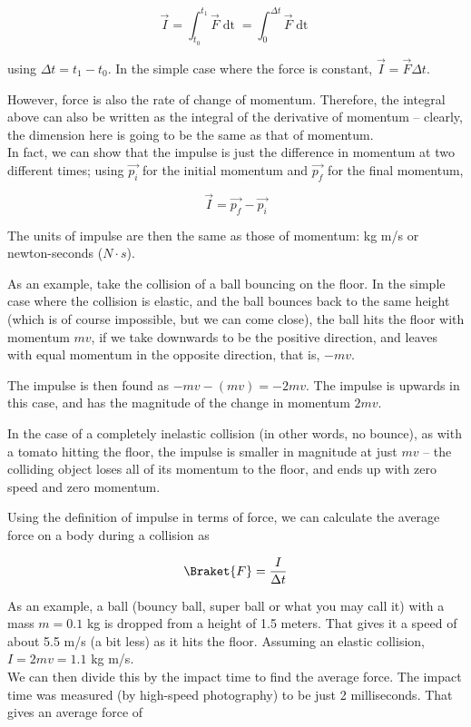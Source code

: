 \begin{equation}
\vec{I} = \int_{t_0}^{t_1} \vec{F} \mathop{dt} = \int_0^{\Delta t} \vec{F} \mathop{dt}
\end{equation}

using $\Delta t = t_1 - t_0$. In the simple case where the force is constant, $\vec{I} = \vec{F} \Delta t$.

However, force is also the rate of change of momentum. Therefore, the integral above can also be written as the integral of the derivative of momentum -- clearly, the dimension here is going to be the same as that of momentum.\\
In fact, we can show that the impulse is just the difference in momentum at two different times; using $\vec{p_i}$ for the initial momentum and $\vec{p_f}$ for the final momentum, 

\begin{equation}
\vec{I} = \vec{p_f} - \vec{p_i}
\end{equation}

The units of impulse are then the same as those of momentum: kg m/s or newton-seconds ($N \cdot s$).

As an example, take the collision of a ball bouncing on the floor. In the simple case where the collision is elastic, and the ball bounces back to the same height (which is of course impossible, but we can come close), the ball hits the floor with momentum $m v$, if we take downwards to be the positive direction, and leaves with equal momentum in the opposite direction, that is, $- m v$.

The impulse is then found as $- mv - (mv) = - 2 m v$. The impulse is upwards in this case, and has the magnitude of the change in momentum $2 m v$.

In the case of a completely inelastic collision (in other words, no bounce), as with a tomato hitting the floor, the impulse is smaller in magnitude at just $m v$ -- the colliding object loses all of its momentum to the floor, and ends up with zero speed and zero momentum.

Using the definition of impulse in terms of force, we can calculate the average force on a body during a collision as

\begin{equation}
\Braket{F} = \frac{I}{\Delta t}
\end{equation}

As an example, a ball (bouncy ball, super ball or what you may call it) with a mass $m = 0.1$ kg is dropped from a height of 1.5 meters. That gives it a speed of about 5.5 m/s (a bit less) as it hits the floor. Assuming an elastic collision, $I = 2 m v = 1.1$ kg m/s.\\
We can then divide this by the impact time to find the average force. The impact time was measured (by high-speed photography) to be just 2 milliseconds. That gives an average force of

